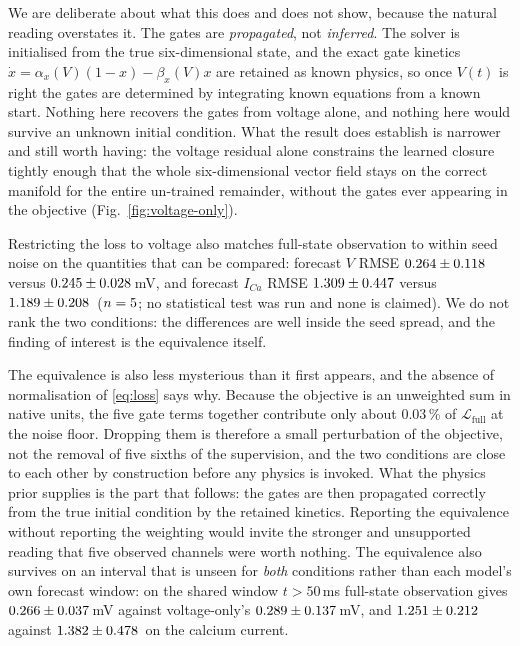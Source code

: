 \documentclass{article}
\newcommand{\Tcommon}{50}      %
\newcommand{\LossShareGates}{0.03}   %
\begin{document}
We are deliberate about what this does and does not show, because the natural
reading overstates it. The gates are \emph{propagated}, not \emph{inferred}. The
solver is initialised from the true six-dimensional state, and the exact gate
kinetics $\dot x = \alpha_x(V)(1-x)-\beta_x(V)x$ are retained as known physics,
so once $V(t)$ is right the gates are determined by integrating known equations
from a known start. Nothing here recovers the gates from voltage alone, and
nothing here would survive an unknown initial condition. What the result does
establish is narrower and still worth having: the voltage residual alone
constrains the learned closure tightly enough that the whole six-dimensional
vector field stays on the correct manifold for the entire un-trained remainder,
without the gates ever appearing in the objective
(Fig.~\ref{fig:voltage-only}).

Restricting the loss to voltage also matches full-state observation to within
seed noise on the quantities that can be compared: forecast $V$ RMSE
$0.264 \pm 0.118$ versus $0.245 \pm 0.028$\,mV, and
forecast $I_{Ca}$ RMSE $1.309 \pm 0.447$ versus
$1.189 \pm 0.208$\,
($n=5$; no statistical test was run and none is claimed). We
do not rank the two conditions: the differences are well
inside the seed spread, and the finding of interest is the equivalence itself.

The equivalence is also less mysterious than it first appears, and the absence of
normalisation of \eqref{eq:loss} says why. Because the objective is an unweighted
sum in native units, the five gate terms together contribute only about
$\LossShareGates$\,\% of $\mathcal{L}_{\mathrm{full}}$ at the noise floor.
Dropping them is therefore a small perturbation of the objective, not the removal
of five sixths of the supervision, and the two conditions are close to each other
by construction before any physics is invoked. What the physics prior supplies is
the part that follows: the gates are then propagated correctly from the true
initial condition by the retained kinetics. Reporting the equivalence without
reporting the weighting would invite the stronger and unsupported reading that
five observed channels were worth nothing.
The equivalence also survives on an interval that is unseen for \emph{both}
conditions rather than each model's own forecast window: on the shared window
$t>\Tcommon$\,ms full-state observation gives $0.266 \pm 0.037$\,mV
against voltage-only's $0.289 \pm 0.137$\,mV, and
$1.251 \pm 0.212$ against $1.382 \pm 0.478$\,
on the calcium current.
\end{document}
